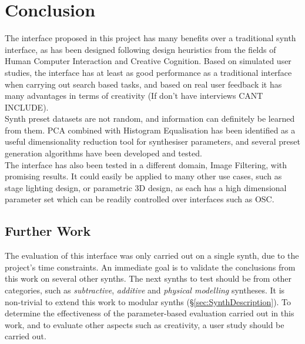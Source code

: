 \documentclass[11pt, oneside]{report}   	%
\begin{document}
%

\chapter{Conclusion}
The interface proposed in this project has many benefits over a traditional synth interface, as has been designed following design heuristics from the fields of Human Computer Interaction and Creative Cognition. Based on simulated user studies, the interface has at least as good performance as a traditional interface when carrying out search based tasks, and based on real user feedback it has many advantages in terms of creativity (If don't have interviews CANT INCLUDE). \\
Synth preset datasets are not random, and information can definitely be learned from them. PCA combined with Histogram Equalisation has been identified as a useful dimensionality reduction tool for synthesiser parameters, and several preset generation algorithms have been developed and tested. \\
The interface has also been tested in a different domain, Image Filtering, with promising results. It could easily be applied to many other use cases, such as stage lighting design, or parametric 3D design, as each has a high dimensional parameter set which can be readily controlled over interfaces such as OSC.
\section{Further Work}
The evaluation of this interface was only carried out on a single synth, due to the project's time constraints. An immediate goal is to validate the conclusions from this work on several other synths. The next synths to test should be from other categories, such as \emph{subtractive}, \emph{additive} and \emph{physical modelling} syntheses. It is non-trivial to extend this work to modular synths (\S \ref{sec:SynthDescription}). To determine the effectiveness of the parameter-based evaluation carried out in this work, and to evaluate other aspects such as creativity, a user study should be carried out.
\end{document}
